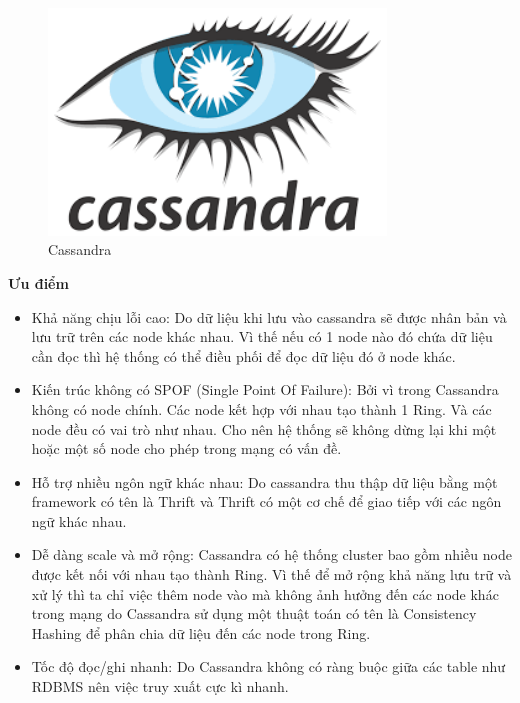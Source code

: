             \begin{figure}[H]   			
            	\includegraphics[width=0.8\textwidth]{Images/cassandra.png}
            	\centering
            	\linebreak
            	\caption{Cassandra}
            \end{figure}
            
            \textbf{Ưu điểm}
            
            \begin{itemize}
                \item Khả năng chịu lỗi cao: Do dữ liệu khi lưu vào cassandra sẽ được nhân bản và lưu trữ trên các node khác nhau. Vì thế nếu có 1 node nào đó chứa dữ liệu cần đọc thì hệ thống có thể điều phối để đọc dữ liệu đó ở node khác.
                \item Kiến trúc không có SPOF (Single Point Of Failure): Bởi vì trong Cassandra không có node chính. Các node kết hợp với nhau tạo thành 1 Ring. Và các node đều có vai trò như nhau. Cho nên hệ thống sẽ không dừng lại khi một hoặc một số node cho phép trong mạng có vấn đề.
                \item Hỗ trợ nhiều ngôn ngữ khác nhau: Do cassandra thu thập dữ liệu bằng một framework có tên là Thrift và Thrift có một cơ chế để giao tiếp với các ngôn ngữ khác nhau.
                \item Dễ dàng scale và mở rộng: Cassandra có hệ thống cluster bao gồm nhiều node được kết nối với nhau tạo thành Ring. Vì thế để mở rộng khả năng lưu trữ và xử lý thì ta chỉ việc thêm node vào mà không ảnh hưởng đến các node khác trong mạng do Cassandra sử dụng một thuật toán có tên là Consistency Hashing để phân chia dữ liệu đến các node trong Ring.
                \item Tốc độ đọc/ghi nhanh: Do Cassandra không có ràng buộc giữa các table như RDBMS nên việc truy xuất cực kì nhanh.
            \end{itemize}
            
